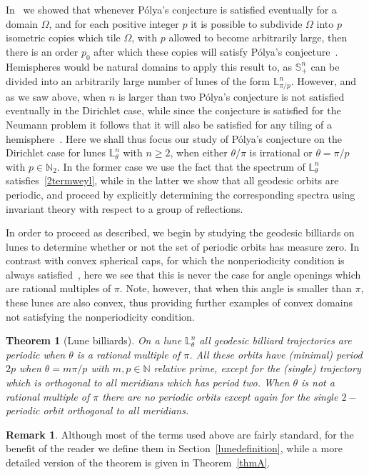 \documentclass[11pt,a4paper,times]{amsart}
\theoremstyle{plain}
\newtheorem{thmx}{Theorem}%
\theoremstyle{definition}
\newtheorem{remark}{Remark}[section]
\numberwithin{equation}{section}
\newcommand{\N}{\mathbb{N}}
\newcommand{\Se}{\mathbb{S}}
\newcommand{\lune}[2]{\mathbb{L}^{#1}_{#2}}
\begin{document}
In~\cite{fs} we showed that whenever P\'{o}lya's conjecture is satisfied eventually for a domain
$\Omega$, and for each positive integer $p$ it is possible to subdivide $\Omega$ into $p$ isometric copies which
tile $\Omega$, with $p$ allowed to become arbitrarily large, then there is an order $p_{0}$ after which these
copies will satisfy P\'{o}lya's conjecture~\cite[Lemma 1]{fs}. Hemispheres would be natural domains to apply this
result to, as $\Se_{+}^{n}$ can be divided into an arbitrarily large number of lunes of the form $\lune{n}{\pi/p}$.
However, and as we saw above, when $n$ is larger than two P\'{o}lya's conjecture is not satisfied eventually in the
Dirichlet case, while since the conjecture is satisfied for the Neumann problem it follows that it will also be
satisfied for any tiling of a hemisphere~\cite{fms}. Here we shall thus focus our study of  P\'{o}lya's conjecture on
the Dirichlet case for lunes $\lune{n}{\theta}$ with $n\geq 2$,  when either $\theta/\pi$ is irrational or
$\theta =\pi/p$ with $p\in \N_2$. In the former case we use the fact that the spectrum of $\lune{n}{\theta}$
satisfies~\eqref{2termweyl}, while in the latter we show that all geodesic orbits are periodic, and proceed by
explicitly determining the corresponding spectra using invariant theory with respect  to a group of reflections.

In order to proceed as described, we begin by studying the geodesic billiards on lunes to determine whether or not
the set of periodic orbits has measure zero. In contrast with convex spherical caps, for which the nonperiodicity
condition is always satisfied~\cite[Example 1.3.16]{sava}, here we see that this is never the case for angle openings
which are rational multiples of $\pi$. Note, however, that when this angle is smaller than $\pi$, these lunes
are also convex, thus providing further examples of convex domains not satisfying the nonperiodicity condition.
\begin{thmx}[Lune billiards]\label{thmx_blunes}
 On a lune $\lune{n}{\theta}$ all geodesic billiard trajectories are periodic when $\theta$ is {a rational multiple of
 $\pi$}. All these orbits have (minimal) period $2p$ {when $\theta=m \pi/p$ with $m,p \in \N$ relative prime}, except
 for the (single) trajectory which is orthogonal to all meridians which has period two. When $\theta$ is not a rational
 multiple of $\pi$ there are no periodic orbits except again for the single $2-$periodic orbit orthogonal to all
 meridians.
\end{thmx}
\begin{remark}
 Although most of the terms used above are fairly standard, for the benefit of the reader we define them in
 Section~\ref{lunedefinition}, while a more detailed version of the theorem is given in Theorem~\ref{thmA}.
\end{remark}
\end{document}
